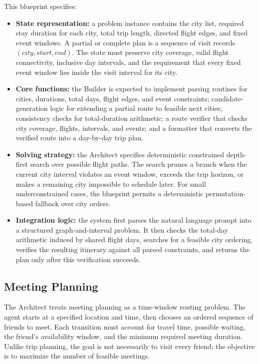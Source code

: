 This blueprint specifies:
\begin{itemize}
    \item \textbf{State representation:} a problem instance contains the city
    list, required stay duration for each city, total trip length, directed
    flight edges, and fixed event windows.  A partial or complete plan is a
    sequence of visit records \((city, start, end)\).  The state must preserve
    city coverage, valid flight connectivity, inclusive day intervals, and the
    requirement that every fixed event window lies inside the visit interval
    for its city.

    \item \textbf{Core functions:} the Builder is expected to implement
    parsing routines for cities, durations, total days, flight edges, and event
    constraints; candidate-generation logic for extending a partial route to
    feasible next cities; consistency checks for total-duration arithmetic; a
    route verifier that checks city coverage, flights, intervals, and events;
    and a formatter that converts the verified route into a day-by-day trip
    plan.

    \item \textbf{Solving strategy:} the Architect specifies deterministic
    constrained depth-first search over possible flight paths.  The search
    prunes a branch when the current city interval violates an event window,
    exceeds the trip horizon, or makes a remaining city impossible to schedule
    later.  For small underconstrained cases, the blueprint permits a
    deterministic permutation-based fallback over city orders.

    \item \textbf{Integration logic:} the system first parses the natural
    language prompt into a structured graph-and-interval problem.  It then
    checks the total-day arithmetic induced by shared flight days, searches for
    a feasible city ordering, verifies the resulting itinerary against all
    parsed constraints, and returns the plan only after this verification
    succeeds.
\end{itemize}

\subsection{Meeting Planning}

The Architect treats meeting planning as a time-window routing problem.  The
agent starts at a specified location and time, then chooses an ordered sequence
of friends to meet.  Each transition must account for travel time, possible
waiting, the friend's availability window, and the minimum required meeting
duration.  Unlike trip planning, the goal is not necessarily to visit every
friend; the objective is to maximize the number of feasible meetings.


